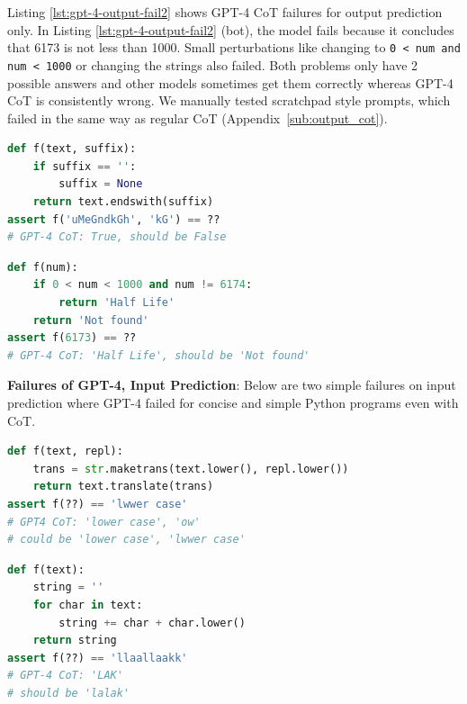\documentclass{article} %
\begin{document}
Listing \ref{lst:gpt-4-output-fail2} shows GPT-4 CoT failures for output prediction only. In Listing \ref{lst:gpt-4-output-fail2} (bot), the model fails because it concludes that 6173 is not less than 1000. Small perturbations like changing to \texttt{0 < num and num < 1000} or changing the strings also failed. Both problems only have 2 possible answers and other models sometimes get them correctly whereas GPT-4 CoT is consistently wrong. We manually tested scratchpad \cite{nye2021show} style prompts, which failed in the same way as regular CoT (Appendix~\ref{sub:output_cot}). 


\begin{lstlisting}[caption={},label={lst:gpt-4-output-fail1}, breaklines=true, language=python]
def f(text, suffix):
    if suffix == '':
        suffix = None
    return text.endswith(suffix)
assert f('uMeGndkGh', 'kG') == ??
# GPT-4 CoT: True, should be False
\end{lstlisting}
\begin{lstlisting}[caption=GPT-4 CoT output failures,label={lst:gpt-4-output-fail2}, breaklines=true, language=python]
def f(num):
    if 0 < num < 1000 and num != 6174:
        return 'Half Life'
    return 'Not found'
assert f(6173) == ??
# GPT-4 CoT: 'Half Life', should be 'Not found'
\end{lstlisting}



\textbf{Failures of GPT-4, Input Prediction}: Below are two simple failures on input prediction where GPT-4 failed for concise and simple Python programs even with CoT.

\begin{minipage}{\columnwidth}
\begin{lstlisting}[caption={},label={lst:gpt-4-input-fail1}, breaklines=true, language=python]
def f(text, repl):
    trans = str.maketrans(text.lower(), repl.lower())
    return text.translate(trans)
assert f(??) == 'lwwer case'
# GPT4 CoT: 'lower case', 'ow'
# could be 'lower case', 'lwwer case'
\end{lstlisting}
\begin{lstlisting}[caption={},label={lst:gpt-4-input-fail2}, breaklines=true, language=python]
def f(text):
    string = ''
    for char in text:
        string += char + char.lower()
    return string
assert f(??) == 'llaallaakk'
# GPT-4 CoT: 'LAK'
# should be 'lalak'
\end{lstlisting}
\end{minipage}
\end{document}
